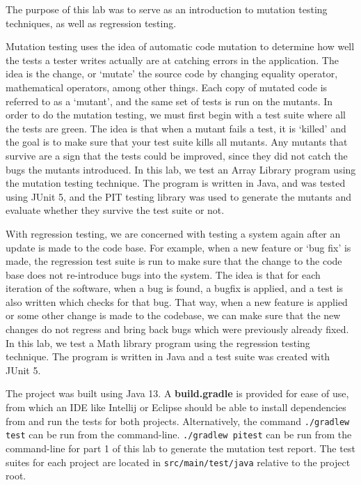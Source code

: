 The purpose of this lab was to serve as an introduction to mutation testing
techniques, as well as regression testing.

Mutation testing uses the idea of automatic code mutation to determine how well
the tests a tester writes actually are at catching errors in the application.
The idea is the change, or `mutate' the source code by changing equality
operator, mathematical operators, among other things. Each copy of mutated code
is referred to as a `mutant', and the same set of tests is run on the mutants.
In order to do the mutation testing, we must first begin with a test suite where
all the tests are green. The idea is that when a mutant fails a test, it is
`killed' and the goal is to make sure that your test suite kills all mutants.
Any mutants that survive are a sign that the tests could be improved, since they
did not catch the bugs the mutants introduced. In this lab, we test an Array
Library program using the mutation testing technique. The program is written in
Java, and was tested using JUnit 5, and the PIT testing library was used to
generate the mutants and evaluate whether they survive the test suite or not.

With regression testing, we are concerned with testing a system again after an
update is made to the code base. For example, when a new feature or `bug fix' is
made, the regression test suite is run to make sure that the change to the code
base does not re-introduce bugs into the system. The idea is that for each
iteration of the software, when a  bug is found, a bugfix is applied, and a test
is also written which checks for that bug. That way, when a new feature is
applied or some other change is made to the codebase, we can make sure that the
new changes do not regress and bring back bugs which were previously already
fixed. In this lab, we test a Math library program using the regression testing
technique. The program is written in Java and a test suite was created with
JUnit 5. 

The project was built using Java 13.
A \textbf{build.gradle} is provided for ease of use,
from which an IDE like Intellij or Eclipse should be able to install
dependencies from and run the tests for both projects. Alternatively, the
command
\texttt{./gradlew test} can be run from the command-line.
\texttt{./gradlew pitest} can be run from the command-line for part 1 of this
lab to generate the mutation test report. 
The test suites for each project are located in \texttt{src/main/test/java}
relative to the project root. 
